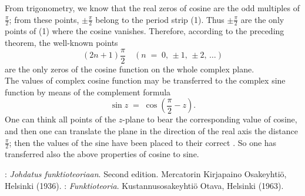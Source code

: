 \documentclass[12pt]{article}
\theoremstyle{definition}
\begin{document}
From trigonometry, we know that the real zeros of cosine are the odd multiples of $\displaystyle\frac{\pi}{2}$; from these points, $\displaystyle\pm\frac{\pi}{2}$ belong to the period strip (1).  Thus $\displaystyle\pm\frac{\pi}{2}$ are the only points of (1) where the cosine vanishes.  Therefore, according to the preceding theorem, the well-known points
$$(2n\!+\!1)\frac{\pi}{2} \quad (n \;=\; 0,\,\pm1,\,\pm2,\,\ldots)$$
are the only zeros of the cosine function on the whole complex plane.\\

The values of complex cosine function may be transferred to the complex sine function by means of the complement formula 
$$\sin{z} \;=\; \cos(\frac{\pi}{2}-z).$$
One can think all points of the $z$-plane to bear the corresponding value of cosine, and then one can translate the plane in the direction of the real axis the distance $\displaystyle\frac{\pi}{2}$; then the values of the sine have been placed to their correct .  So one has transferred also the above properties of cosine to sine.


\begin{thebibliography}{8}
: {\em Johdatus funktioteoriaan}.  Second edition. Mercatorin Kirjapaino Osakeyhti\"o, Helsinki (1936).
: {\em Funktioteoria}.  Kustannusosakeyhti\"o Otava, Helsinki (1963).
\end{thebibliography} 



 



\end{document}
